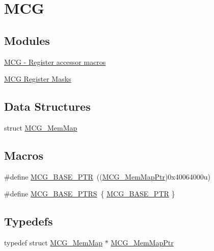 \hypertarget{group___m_c_g___peripheral}{}\section{M\+C\+G}
\label{group___m_c_g___peripheral}
\subsection*{Modules}
\begin{DoxyCompactItemize}
\item 
\hyperlink{group___m_c_g___register___accessor___macros}{M\+C\+G -\/ Register accessor macros}
\item 
\hyperlink{group___m_c_g___register___masks}{M\+C\+G Register Masks}
\end{DoxyCompactItemize}
\subsection*{Data Structures}
\begin{DoxyCompactItemize}
\item 
struct \hyperlink{struct_m_c_g___mem_map}{M\+C\+G\+\_\+\+Mem\+Map}
\end{DoxyCompactItemize}
\subsection*{Macros}
\begin{DoxyCompactItemize}
\item 
\#define \hyperlink{group___m_c_g___peripheral_gaceefc72e93a47a35f59a31c57dddf41b}{M\+C\+G\+\_\+\+B\+A\+S\+E\+\_\+\+P\+T\+R}~((\hyperlink{group___m_c_g___peripheral_ga1cb93dd00863c129e7753ec45a7c3563}{M\+C\+G\+\_\+\+Mem\+Map\+Ptr})0x40064000u)
\item 
\#define \hyperlink{group___m_c_g___peripheral_ga3e6aec328b7327acc1f7bff70bec388c}{M\+C\+G\+\_\+\+B\+A\+S\+E\+\_\+\+P\+T\+R\+S}~\{ \hyperlink{group___m_c_g___peripheral_gaceefc72e93a47a35f59a31c57dddf41b}{M\+C\+G\+\_\+\+B\+A\+S\+E\+\_\+\+P\+T\+R} \}
\end{DoxyCompactItemize}
\subsection*{Typedefs}
\begin{DoxyCompactItemize}
\item 
typedef struct \hyperlink{struct_m_c_g___mem_map}{M\+C\+G\+\_\+\+Mem\+Map} $\ast$ \hyperlink{group___m_c_g___peripheral_ga1cb93dd00863c129e7753ec45a7c3563}{M\+C\+G\+\_\+\+Mem\+Map\+Ptr}
\end{DoxyCompactItemize}


